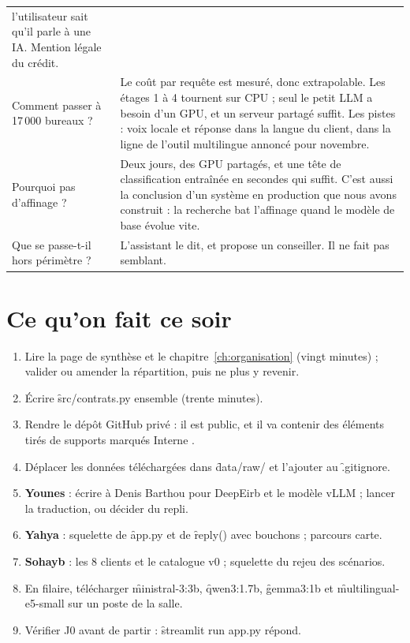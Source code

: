 \begin{center}
\begin{longtable}{@{}L{4.6cm} L{9.8cm}@{}}
  l'utilisateur sait qu'il parle à une IA. Mention légale du crédit. \\
\addlinespace
Comment passer à 17\,000 bureaux ? & Le coût par requête est mesuré, donc extrapolable. Les étages
  1 à 4 tournent sur CPU ; seul le petit LLM a besoin d'un GPU, et un serveur partagé suffit. Les
  pistes : voix locale et réponse dans la langue du client, dans la ligne de l'outil multilingue
  annoncé pour novembre. \\
\addlinespace
Pourquoi pas d'affinage ? & Deux jours, des GPU partagés, et une tête de classification entraînée
  en secondes qui suffit. C'est aussi la conclusion d'un système en production que nous avons
  construit : la recherche bat l'affinage quand le modèle de base évolue vite. \\
\addlinespace
Que se passe-t-il hors périmètre ? & L'assistant le dit, et propose un conseiller. Il ne fait pas
  semblant. \\
\bottomrule
\end{longtable}
\end{center}

\section{Ce qu'on fait ce soir}

\begin{enumerate}
  \item Lire la page de synthèse et le chapitre~\ref{ch:organisation} (vingt minutes) ; valider ou
        amender la répartition, puis ne plus y revenir.
  \item Écrire \f{src/contrats.py} ensemble (trente minutes).
  \item Rendre le dépôt GitHub privé : il est public, et il va contenir des éléments tirés de
        supports marqués \og Interne \fg.
  \item Déplacer les données téléchargées dans \f{data/raw/} et l'ajouter au \f{.gitignore}.
  \item \textbf{Younes} : écrire à Denis Barthou pour DeepEirb et le modèle vLLM ; lancer la
        traduction, ou décider du repli.
  \item \textbf{Yahya} : squelette de \f{app.py} et de \f{reply()} avec bouchons ; parcours carte.
  \item \textbf{Sohayb} : les 8 clients et le catalogue v0 ; squelette du rejeu des scénarios.
  \item En filaire, télécharger \f{ministral-3:3b}, \f{qwen3:1.7b}, \f{gemma3:1b} et
        \f{multilingual-e5-small} sur un poste de la salle.
  \item Vérifier J0 avant de partir : \f{streamlit run app.py} répond.
\end{enumerate}
